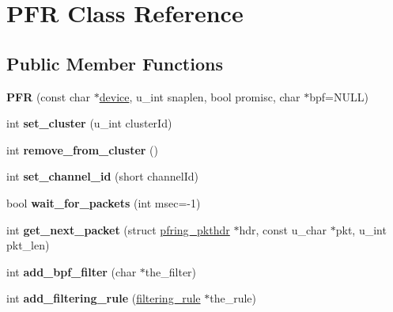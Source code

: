 \hypertarget{class_p_f_r}{
\section{PFR Class Reference}
\label{class_p_f_r}
}
\subsection*{Public Member Functions}
\begin{DoxyCompactItemize}
\item 
\hypertarget{class_p_f_r_a9a362a7824b37d99ff5decd81c6faa94}{
{\bfseries PFR} (const char $\ast$\hyperlink{structdevice}{device}, u\_\-int snaplen, bool promisc, char $\ast$bpf=NULL)}
\label{class_p_f_r_a9a362a7824b37d99ff5decd81c6faa94}

\item 
\hypertarget{class_p_f_r_a8b20b727647d3759b4268ce8e44df1b2}{
int {\bfseries set\_\-cluster} (u\_\-int clusterId)}
\label{class_p_f_r_a8b20b727647d3759b4268ce8e44df1b2}

\item 
\hypertarget{class_p_f_r_a0e73757d8283e15c42c3a91a5ac18bdb}{
int {\bfseries remove\_\-from\_\-cluster} ()}
\label{class_p_f_r_a0e73757d8283e15c42c3a91a5ac18bdb}

\item 
\hypertarget{class_p_f_r_a043e5601e394625a0e90d16f89bfa67b}{
int {\bfseries set\_\-channel\_\-id} (short channelId)}
\label{class_p_f_r_a043e5601e394625a0e90d16f89bfa67b}

\item 
\hypertarget{class_p_f_r_abe93f8324dfe218245daa1f993ec83dc}{
bool {\bfseries wait\_\-for\_\-packets} (int msec=-\/1)}
\label{class_p_f_r_abe93f8324dfe218245daa1f993ec83dc}

\item 
\hypertarget{class_p_f_r_a18556644c0d8ff2f492d46b17a0d5fe7}{
int {\bfseries get\_\-next\_\-packet} (struct \hyperlink{structpfring__pkthdr}{pfring\_\-pkthdr} $\ast$hdr, const u\_\-char $\ast$pkt, u\_\-int pkt\_\-len)}
\label{class_p_f_r_a18556644c0d8ff2f492d46b17a0d5fe7}

\item 
\hypertarget{class_p_f_r_a38d3e1ae7fff1f8ac1e30c416764afbf}{
int {\bfseries add\_\-bpf\_\-filter} (char $\ast$the\_\-filter)}
\label{class_p_f_r_a38d3e1ae7fff1f8ac1e30c416764afbf}

\item 
\hypertarget{class_p_f_r_a31d54682b47ff2ebd99c169590439184}{
int {\bfseries add\_\-filtering\_\-rule} (\hyperlink{structfiltering__rule}{filtering\_\-rule} $\ast$the\_\-rule)}
\label{class_p_f_r_a31d54682b47ff2ebd99c169590439184}


\end{DoxyCompactItemize}
